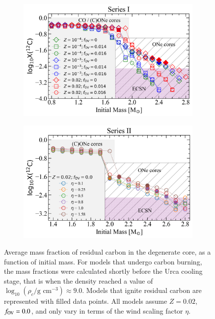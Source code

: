 \documentclass[main.tex]{subfiles}
\begin{document}
\begin{figure}[h!]
    \centering
    \begin{subfigure}{0.5\textwidth}
      \centering
      \includegraphics[width=0.95\columnwidth]{figures/chapter2/carbon_fractions/c12_distribution_series1.png}
    \end{subfigure}%
    \begin{subfigure}{0.5\textwidth}
      \centering
      \includegraphics[width=0.95\columnwidth]{figures/chapter2/carbon_fractions/c12_distribution_series2.png}
    \end{subfigure}
    \caption{Average mass fraction of residual carbon in the degenerate core, as a function of initial mass. For models that undergo carbon burning, the mass fractions were calculated shortly before the Urca cooling stage, that is when the density reached a value of $\log_{10} (\rho_c / \text{g cm}^{-3}) \approx 9.0$. Models that ignite residual carbon are represented with filled data points. All \seriestwo models assume $Z=0.02$, $f_{\rm OV}=0.0$, and only vary in terms of the wind scaling factor $\eta$.}
    \label{fig:carbon_mass_fractions}
\end{figure}
\end{document}

